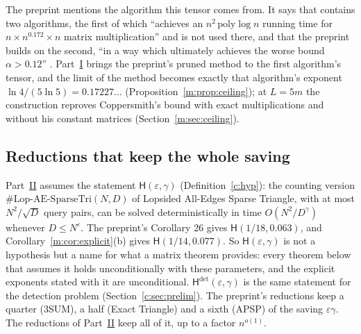 \documentclass[11pt]{article}
\theoremstyle{definition}
\theoremstyle{remark}
\newcommand{\Lop}{\mathrm{Lop}\text{-}\allowbreak\mathrm{AE}\text{-}\allowbreak\mathrm{SparseTri}}
\newcommand{\Hyp}{\mathsf{H}}
\begin{document}
The preprint mentions the algorithm this tensor comes from. It says that \cite{Cop82} contains two algorithms, the first of which ``achieves an $n^2\,\mathrm{poly}\log n$ running time for $n\times n^{0.172}\times n$ matrix multiplication'' and is not used there, and that the preprint builds on the second, ``in a way which ultimately achieves the worse bound $\alpha>0.12$'' \cite[Section 1.1]{ZT}. Part~\hyperref[m:partI]{I} brings the preprint's pruned method to the first algorithm's tensor, and the limit of the method becomes exactly that algorithm's exponent $\ln4/(5\ln5)=0.17227\ldots$ (Proposition~\ref{m:prop:ceiling}); at $L=5m$ the construction reproves Coppersmith's bound with exact multiplications and without his constant matrices (Section~\ref{m:sec:ceiling}).

\subsection{Reductions that keep the whole saving}\label{m:sec:intro:reductions}

Part~\hyperref[m:partII]{II} assumes the statement $\Hyp(\varepsilon,\gamma)$ (Definition~\ref{c:hyp}): the counting version $\#\Lop(N,D)$ of Lopsided All-Edges Sparse Triangle, with at most $N^2/\sqrt D$ query pairs, can be solved deterministically in time $O(N^2/D^\gamma)$ whenever $D\le N^\varepsilon$. The preprint's Corollary 26 gives $\Hyp(1/18,0.063)$, and Corollary~\ref{m:cor:explicit}(b) gives $\Hyp(1/14,0.077)$. So $\Hyp(\varepsilon,\gamma)$ is not a hypothesis but a name for what a matrix theorem provides: every theorem below that assumes it holds unconditionally with these parameters, and the explicit exponents stated with it are unconditional. $\Hyp^{\det}(\varepsilon,\gamma)$ is the same statement for the detection problem (Section~\ref{c:sec:prelim}). The preprint's reductions keep a quarter (3SUM), a half (Exact Triangle) and a sixth (APSP) of the saving $\varepsilon\gamma$. The reductions of Part~\hyperref[m:partII]{II} keep all of it, up to a factor $n^{o(1)}$.
\end{document}
